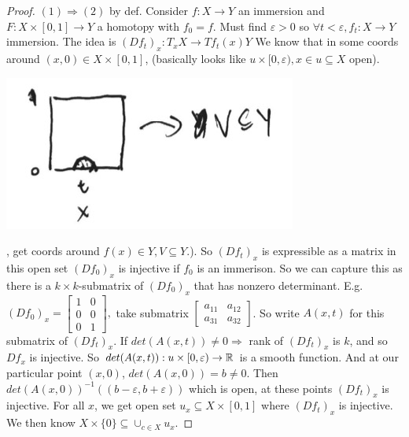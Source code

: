 \begin{proof}
  $(1) \Rightarrow (2)$ by def.
  \newline Consider $f: X \to Y$ an immersion and $F:X \times [0,1] \to Y$ a homotopy with $f_0 = f$. Must find $\varepsilon>0 $ so $\forall t < \varepsilon , f_t : X\to Y$ immersion.
  \newline The idea is $(Df_t)_x: T_xX \to Tf_t(x)Y$
  \newline We know that in some coords around $(x,0) \in X \times [0,1]$, (basically looks like $u \times [0, \varepsilon), x \in u\subseteq X$ open).
  \begin{center}
    \includegraphics[width=0.30\paperwidth]{difftop/week06/coords}
  \end{center}
  , get coords around $f(x)\in Y, V\subseteq Y.$).
  \newline So $(Df_t)_x$ is expressible as a matrix in this open set $(Df_0)_x$ is injective if $f_0$ is an immerison. So we can capture this as there is a $k \times k$-submatrix of $(Df_0)_x$ that has nonzero determinant.
    \newline E.g. $(Df_0)_x = \begin{bmatrix}
      1 & 0 \\
      0 & 0 \\
      0 & 1
    \end{bmatrix},$ take submatrix $\begin{bmatrix}
      a_{11} & a_{12} \\
      a_{31} & a_{32}
    \end{bmatrix}$.
    \newline So write $A(x,t)$ for this submatrix of $(Df_t)_x$. If $det (A(x,t)) \neq 0 \Rightarrow $ rank of $(Df_t)_x$ is $k$, and so $Df_x$ is injective.
      \newline  So $det(A(x,t)): u \times [0, \varepsilon ) \to \mathbb{R}$ is a smooth function. And at our particular point $(x,0)$, $det(A(x,0))=b \neq 0$. Then $det(A(x,0)) ^{-1} \left((b-\varepsilon, b+ \varepsilon)\right)$ which is open, at these points $(Df_t)_x$ is injective. For all $x$, we get open set $u_x \subseteq X \times [0,1] $ where $(Df_t)_x$ is injective. We then know $X \times \{0\} \subseteq \cup_{c\in X}u_x$.

\end{proof}
